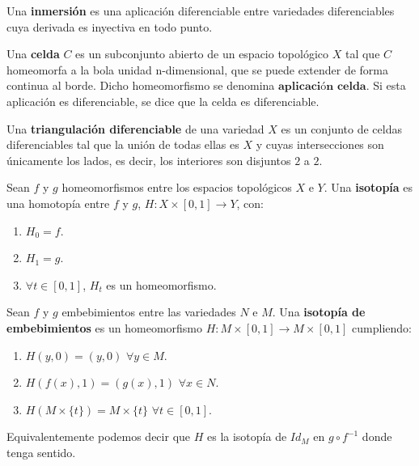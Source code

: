 \begin{definicion} Una \textbf{inmersión} es una aplicación diferenciable entre variedades diferenciables cuya derivada es inyectiva en todo punto.
\end{definicion}

\begin{definicion} Una \textbf{celda} $C$ es un subconjunto abierto de un espacio topológico $X$ tal que $C$ homeomorfa a la bola unidad n-dimensional, que se puede extender de forma continua al borde. Dicho homeomorfismo se denomina $\textbf{aplicación celda}$. Si esta aplicación es diferenciable, se dice que la celda es diferenciable.
\end{definicion}

\begin{definicion} Una \textbf{triangulación diferenciable} de una variedad $X$ es un conjunto de celdas diferenciables tal que la unión de todas ellas es $X$ y cuyas intersecciones son únicamente los lados, es decir, los interiores son disjuntos $2$ a $2$.
\end{definicion}

\begin{definicion} Sean $f$ y $g$ homeomorfismos entre los espacios topológicos $X$ e $Y$. Una \textbf{isotopía} es una homotopía entre $f$ y $g$, $H: X \times [0,1] \rightarrow Y$, con:
	\begin{enumerate}
		\item $H_0 = f$.
		\item $H_1 = g$.
		\item $\forall t \in [0,1]$, $H_t$ es un homeomorfismo.
	\end{enumerate}
\end{definicion}

\begin{definicion} Sean $f$ y $g$ embebimientos entre las variedades $N$ e $M$. Una \textbf{isotopía de embebimientos} es un homeomorfismo $H: M \times [0,1] \rightarrow M \times [0,1]$ cumpliendo:
	\begin{enumerate}
		\item $H(y, 0) = (y, 0)$ $\forall y \in M$.
		\item $H(f(x), 1) = (g(x), 1)$ $\forall x \in N$.
		\item $H(M \times \{t\}) = M \times \{t\}$ $\forall t \in [0,1]$.
	\end{enumerate}
	
	Equivalentemente podemos decir que $H$ es la isotopía de $Id_M$ en $g \circ f^{-1}$ donde tenga sentido.
\end{definicion}


\endinput
